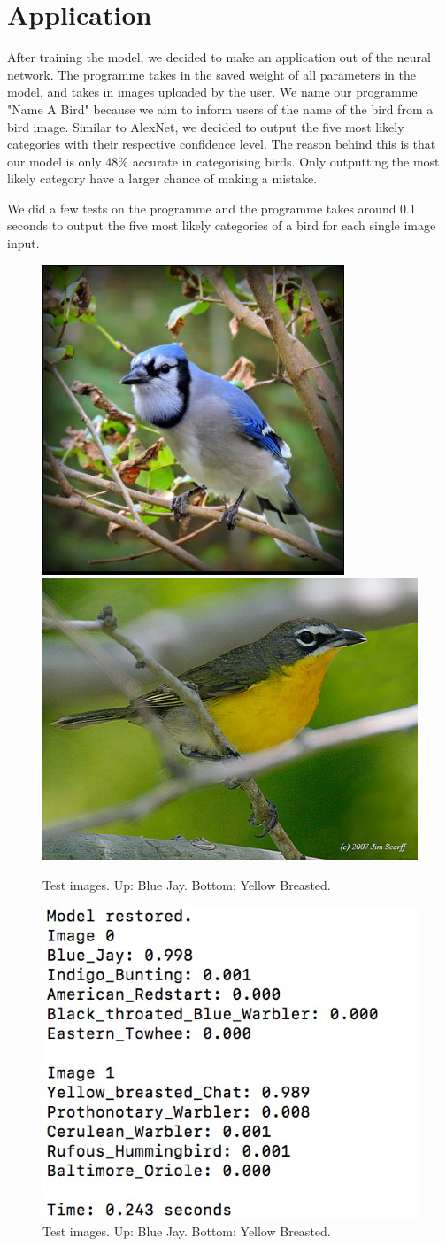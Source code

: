 \documentclass[letterpaper, 12pt]{article}
\begin{document}
\section{Application}
After training the model, we decided to make an application out of the neural network. The programme takes in the saved weight of all parameters in the model, and
takes in images uploaded by the user. We name our programme "Name A Bird" because we aim to inform users of the name of the bird from a bird image. Similar to AlexNet,
we decided to output the five most likely categories with their respective confidence level. The reason behind this is that our model is only 48\% accurate in
categorising birds. Only outputting the most likely category have a larger chance of making a mistake.

We did a few tests on the programme and the programme takes around 0.1 seconds to output the five most likely categories of a bird for each single image input.
\begin{figure}[htp]
\centering
\includegraphics[width=.25\textwidth]{Blue_jay}\hfill
\includegraphics[width=.25\textwidth]{Yellow_breasted}
\caption{Test images. Up: Blue Jay. Bottom: Yellow Breasted.}
\end{figure}

\begin{figure}
\includegraphics[width=.45\textwidth]{test}
\caption{Test images. Up: Blue Jay. Bottom: Yellow Breasted.}
\end{figure}
\end{document}
